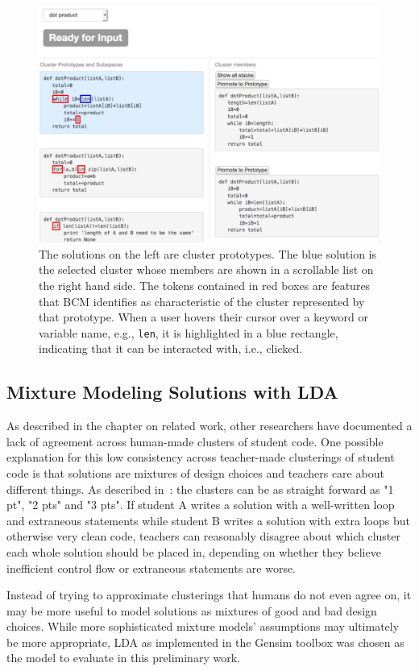 \begin{figure}[ht]
\includegraphics[width=0.75\columnwidth]{Body/figures/grovercode/overcode_ibcm}
\caption{The solutions on the left are cluster prototypes. The blue solution is the selected cluster whose members are shown in a scrollable list on the right hand side. The tokens contained in red boxes are features that BCM identifies as characteristic of the cluster represented by that prototype. When a user hovers their cursor over a keyword or variable name, e.g., \texttt{len}, it is highlighted in a blue rectangle, indicating that it can be interacted with, i.e., clicked.}
\label{overcode_ibcm}
\end{figure} 

\subsection{Mixture Modeling Solutions with LDA}

As described in the chapter on related work, other researchers have documented a lack of agreement across human-made clusters of student code. One possible explanation for this low consistency across teacher-made clusterings of student code is that solutions are mixtures of design choices and teachers care about different things. As described in~\cite{berkeleymastersthesis}: the clusters can be as straight forward as "1 pt", "2 pts" and "3 pts". If student A writes a solution with a well-written loop and extraneous statements while student B writes a solution with extra loops but otherwise very clean code, teachers can reasonably disagree about which cluster each whole solution should be placed in, depending on whether they believe inefficient control flow or extraneous statements are worse.

Instead of trying to approximate clusterings that humans do not even agree on, it may be more useful to model solutions as mixtures of good and bad design choices. While more sophisticated mixture models' assumptions may ultimately be more appropriate, LDA \cite{lda} as implemented in the Gensim toolbox \cite{gensim} was chosen as the model to evaluate in this preliminary work. 

